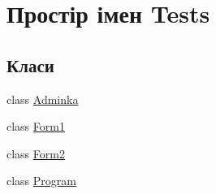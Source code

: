 \hypertarget{namespace_tests}{}\section{Простір імен Tests}
\label{namespace_tests}
\subsection*{Класи}
\begin{DoxyCompactItemize}
\item 
class \hyperlink{class_tests_1_1_adminka}{Adminka}
\item 
class \hyperlink{class_tests_1_1_form1}{Form1}
\item 
class \hyperlink{class_tests_1_1_form2}{Form2}
\item 
class \hyperlink{class_tests_1_1_program}{Program}
\end{DoxyCompactItemize}
